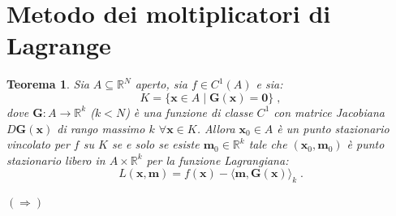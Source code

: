 \documentclass[a4paper,12pt]{report}
\theoremstyle{plain}
\newtheorem{thm}{Teorema}[section]
\theoremstyle{definition}
\theoremstyle{remark}
\numberwithin{equation}{section}
\begin{document}
\section{Metodo dei moltiplicatori di Lagrange}
\begin{thm} Sia $A \subseteq \mathbb{R}^N$ aperto, sia $f \in C^1(A)$ e sia:
\begin{equation}
K=\{\mathbf{x} \in A\;|\; \mathbf{G}(\mathbf{x})=\mathbf{0}\}\;,
\end{equation}
dove $\mathbf{G}:A \to \mathbb{R}^k$ ($k<N$) è una funzione di classe $C^1$ con matrice Jacobiana $D\mathbf{G}(\mathbf{x})$ di rango 
massimo $k$ $\forall \mathbf{x} \in K$. Allora $\mathbf{x}_0 \in A$ è un punto stazionario vincolato per $f$ su $K$ se e solo se esiste 
$\mathbf{m}_0 \in \mathbb{R}^k$ tale che $(\mathbf{x}_0,\mathbf{m}_0)$ è punto stazionario libero in $A \times \mathbb{R}^k$ per la 
funzione Lagrangiana:
\begin{equation}
L(\mathbf{x},\mathbf{m})=f(\mathbf{x})-\langle \mathbf{m},\mathbf{G}(\mathbf{x})\rangle_k\;.
\end{equation}
\end{thm}
\proof $(\Longrightarrow)$ \\
\end{document}
